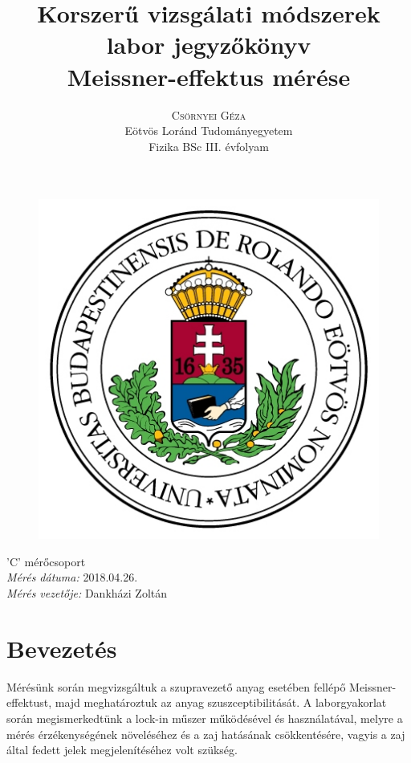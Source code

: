 \documentclass[12pt,a4paper]{article}
\title{\huge{Korszerű vizsgálati módszerek labor jegyzőkönyv}\\ \vspace{20pt}
\textbf{Meissner-effektus mérése}}
\author{\Large{\textsc{Csörnyei Géza}} \vspace{10pt}\\
	\textrm{Eötvös Loránd Tudományegyetem}\\
	\textrm{Fizika BSc III. évfolyam}
	}
\date{}
\begin{document}
\addtolength{\voffset}{-1.0cm}
\addtolength{\textheight}{1.0cm}
\begin{titlepage}
\maketitle

\begin{figure}[!htb]
\centering
\includegraphics[scale=0.6]{eltecimer.jpg}
\end{figure}

\hfil \Large{'C' mérőcsoport}\hfil  \\
\vspace*{2pt}
\hfil \Large{\emph{Mérés dátuma:} 2018.04.26.}\hfil \\
\vspace*{2pt}
\hfil \hspace*{45pt} \Large{\emph{Mérés vezetője:} Dankházi Zoltán}\hfil
\thispagestyle{empty}
\end{titlepage}

\section{Bevezetés}
\hspace*{10pt} Mérésünk során megvizsgáltuk a szupravezető anyag esetében fellépő Meissner-effektust, majd meghatároztuk az anyag szuszceptibilitását. A laborgyakorlat során megismerkedtünk a lock-in műszer működésével és használatával, melyre a mérés érzékenységének növeléséhez és a zaj hatásának csökkentésére, vagyis a zaj által fedett jelek megjelenítéséhez volt szükség.
\end{document}
